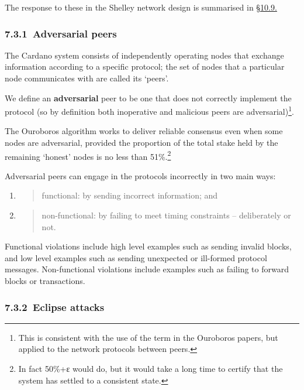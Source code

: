 \documentclass[]{article}
\begin{document}
The response to these in the Shelley network design is summarised in
\protect\hyperlink{summary-response-to-threats}{{§10.9.}}

\hypertarget{adversarial-peers}{%
\subsubsection{​7.3.1​~Adversarial peers}\label{adversarial-peers}}

The Cardano system consists of independently operating nodes that
exchange information according to a specific protocol; the set of nodes
that a particular node communicates with are called its `peers'.

We define an \textbf{adversarial} peer to be one that does not correctly
implement the protocol (so by definition both inoperative and malicious
peers are adversarial)\footnote{This is consistent with the use of the
  term in the Ouroboros papers, but applied to the network protocols
  between peers.}.

The Ouroboros algorithm works to deliver reliable consensus even when
some nodes are adversarial, provided the proportion of the total stake
held by the remaining `honest' nodes is no less than 51\%.\footnote{In
  fact 50\%+ε would do, but it would take a long time to certify that
  the system has settled to a consistent state.}

Adversarial peers can engage in the protocols incorrectly in two main
ways:

\begin{enumerate}
\def\labelenumi{\arabic{enumi}.}
\item
  \begin{quote}
  functional: by sending incorrect information; and
  \end{quote}
\item
  \begin{quote}
  non-functional: by failing to meet timing constraints -- deliberately
  or not.
  \end{quote}
\end{enumerate}

Functional violations include high level examples such as sending
invalid blocks, and low level examples such as sending unexpected or
ill-formed protocol messages. Non-functional violations include examples
such as failing to forward blocks or transactions.

\hypertarget{eclipse-attacks}{%
\subsubsection{​7.3.2​~Eclipse attacks}\label{eclipse-attacks}}
\end{document}
